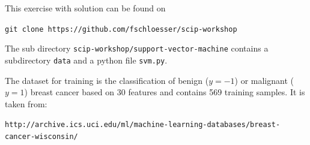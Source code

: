 \documentclass[11pt]{article}
\newcommand\ttt\texttt
\begin{document}
This exercise with solution can be found on
\begin{center}
  \ttt{git clone https://github.com/fschloesser/scip-workshop}
\end{center}

The sub directory \ttt{scip-workshop/support-vector-machine} contains a subdirectory \ttt{data} and a python file \ttt{svm.py}.

The dataset for training is the classification of benign ($y=-1$) or malignant ($y=1$) breast cancer based on 30 features and contains 569 training samples.
It is taken from:

\begin{center}
  \ttt{\footnotesize http://archive.ics.uci.edu/ml/machine-learning-databases/breast-cancer-wisconsin/}
\end{center}
\end{document}

